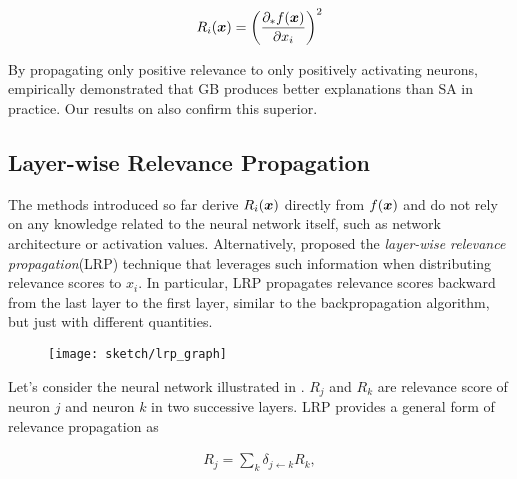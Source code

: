 \begin{align*}
	R_i(\x) = \bigg( \frac{ \partial_* f(\patvector{x}) }{ \partial x_i }  \bigg)^2
\end{align*}

By propagating only positive relevance to only positively activating neurons, \citet{SpringenbergStrivingSimplicityAll2015a} empirically demonstrated that GB produces better explanations than SA in practice. Our results on \addfigure{\ref{fig:lenet_heatmaps}} also confirm this superior.
%

\subsection{Layer-wise Relevance Propagation}
The methods introduced so far derive $R_i(\boldsymbol{x})$ directly from $f(\patvector{x})$ and do not rely on any knowledge related to the neural network itself, such as network architecture or activation values. Alternatively, \citet{BachPixelWiseExplanationsNonLinear2015} proposed the \textit{layer-wise relevance propagation}(LRP) technique that leverages such information when distributing relevance scores to $x_i$. In particular, LRP propagates relevance scores backward from the last layer to the first layer, similar to the backpropagation algorithm, but just with different quantities.




 \begin{figure}
	\begin{center}
		\texttt{[image: sketch/lrp\_graph]}
		\label{fig:lrp_graph}
	\end{center}
\end{figure}

Let's consider the neural network illustrated in \addfigure{\ref{fig:lrp_graph}}. $R_j$ and $R_k$ are relevance score of  neuron $j$ and neuron $k$ in two successive layers.  LRP provides a general form of relevance propagation as 

\begin{align} \label{eq:general_lrp_rj}
	R_j = \sum_{k} 	\delta_{j\leftarrow k} R_{k} ,
\end{align}

